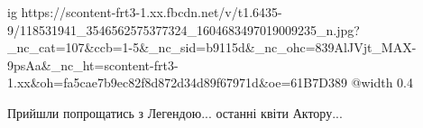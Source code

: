  
 
 
 
 

\ifcmt
  ig https://scontent-frt3-1.xx.fbcdn.net/v/t1.6435-9/118531941_3546562575377324_1604683497019009235_n.jpg?_nc_cat=107&ccb=1-5&_nc_sid=b9115d&_nc_ohc=839AlJVjt_MAX-9psAa&_nc_ht=scontent-frt3-1.xx&oh=fa5cae7b9ec82f8d872d34d89f67971d&oe=61B7D389
  @width 0.4
\fi


Прийшли попрощатись з Легендою... останні квіти Актору...
